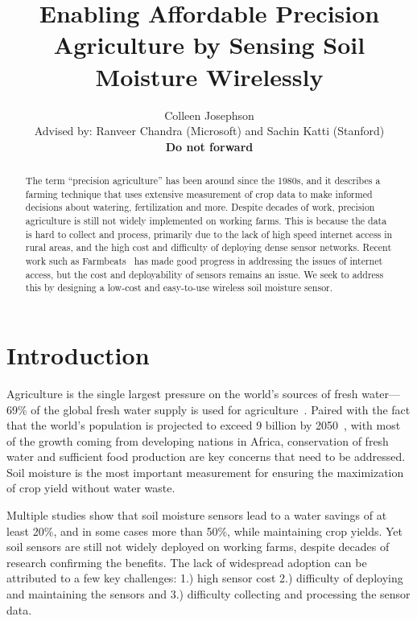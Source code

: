 \documentclass[12pt]{article}
\title{Enabling Affordable Precision Agriculture by Sensing Soil Moisture Wirelessly}
\author{Colleen Josephson\\Advised by:  Ranveer Chandra (Microsoft) and Sachin Katti (Stanford)\\\textbf{Do not forward}}
\begin{document}
\maketitle

\begin{abstract}
  The term ``precision agriculture'' has been around since the 1980s,
  and it describes a farming technique that uses extensive measurement
  of crop data to make informed decisions about watering,
  fertilization and more. Despite decades of work, precision
  agriculture is still not widely implemented on working farms. This
  is because the data is hard to collect and process, primarily due to
  the lack of high speed internet access in rural areas, and the high
  cost and difficulty of deploying dense sensor networks. Recent work
  such as Farmbeats~\cite{farmbeats} has made good progress in
  addressing the issues of internet access, but the cost and
  deployability of sensors remains an issue. We seek to address this
  by designing a low-cost and easy-to-use wireless soil moisture
  sensor.
\end{abstract}


\section*{Introduction}

Agriculture is the single largest pressure on the world's sources of
fresh water--- 69\% of the global fresh water supply is used for
agriculture~\cite{water}. Paired with the fact that the world's
population is projected to exceed 9 billion by 2050~\cite{population},
with most of the growth coming from developing nations in Africa,
conservation of fresh water and sufficient food production are key
concerns that need to be addressed. Soil moisture is the most
important measurement for ensuring the maximization of crop yield
without water waste.

Multiple studies show that soil moisture sensors lead to a water
savings of at least 20\%\cite{watersavings}, and in some cases more
than 50\%, while maintaining crop yields. Yet soil sensors are still
not widely deployed on working farms, despite decades of research
confirming the benefits. The lack of widespread adoption can be
attributed to a few key challenges: 1.) high sensor cost 2.)
difficulty of deploying and maintaining the sensors and 3.) difficulty
collecting and processing the sensor data.
\end{document}
